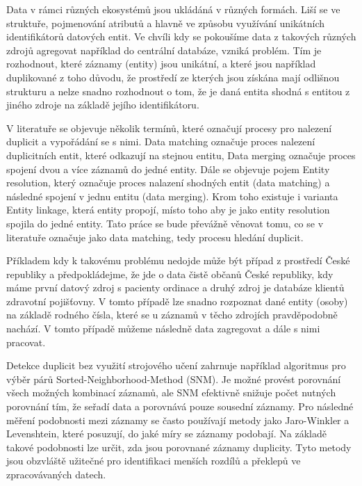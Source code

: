 Data v rámci různých ekosystémů jsou ukládáná v různých formách. Liší se ve struktuře, pojmenování atributů a hlavně ve způsobu využívání unikátních identifikátorů datových entit. Ve chvíli kdy se pokoušíme data z takových různých zdrojů agregovat například do centrální databáze, vzniká problém. Tím je rozhodnout, které záznamy (entity) jsou unikátní, a které jsou například duplikované z toho důvodu, že prostředí ze kterých jsou získána mají odlišnou strukturu a nelze snadno rozhodnout o tom, že je daná entita shodná s entitou z jiného zdroje na základě jejího identifikátoru.

V literatuře se objevuje několik termínů, které označují procesy pro nalezení duplicit a vypořádání se s nimi. Data matching označuje proces nalezení duplicitních entit, které odkazují na stejnou entitu, Data merging označuje proces spojení dvou a více záznamů do jedné entity. Dále se objevuje pojem Entity resolution, který označuje proces nalazení shodných entit (data matching) a následné spojení v jednu entitu (data merging). Krom toho existuje i varianta Entity linkage, která entity propojí, místo toho aby je jako entity resolution spojila do jedné entity.
Tato práce se bude převážně věnovat tomu, co se v literatuře označuje jako data matching, tedy procesu hledání duplicit.

Příkladem kdy k takovému problému nedojde může být případ z prostředí České republiky a předpokládejme, že jde o data čistě občanů České republiky, kdy máme první datový zdroj s pacienty ordinace a druhý zdroj je databáze klientů zdravotní pojišťovny. V tomto případě lze snadno rozpoznat dané entity (osoby) na základě rodného čísla, které se u záznamů v těcho zdrojích pravděpodobně nachází. V tomto případě můžeme následně data zagregovat a dále s nimi pracovat.

Detekce duplicit bez využití strojového učení zahrnuje například algoritmus pro výběr párů Sorted-Neighborhood-Method (SNM). Je možné provést porovnání všech možných kombinací záznamů, ale SNM efektivně snižuje počet nutných porovnání tím, že seřadí data a porovnává pouze sousední záznamy. Pro následné měření podobnosti mezi záznamy se často používají metody jako Jaro-Winkler a Levenshtein, které posuzují, do jaké míry se záznamy podobají. Na základě takové podobnosti lze určit, zda jsou porovnané záznamy duplicity. Tyto metody jsou obzvláště užitečné pro identifikaci menších rozdílů a překlepů ve zpracovávaných datech. \cite{draisbach_choosing_2013}

